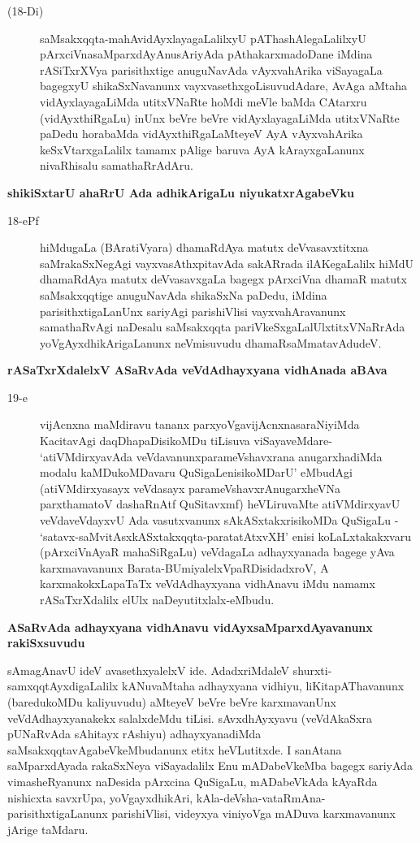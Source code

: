\begin{description}
\item[(18-Di)] saMsakxqqta-mahAvidAyxlayagaLalilxyU pAThashAlegaLalilxyU pArxciVna\break saMparxdAyAnu\-sAri\-yAda pAthakarxmadoDane iMdina rASiTxrXVya pari\-sithxtige anuguNavAda vAyxvahArika viSayagaLa bagegxyU shikaSxNavanunx vayxvasethxgoLisuvudAdare, AvAga aMtaha vidAyxlayagaLiMda utitxVNaRte hoMdi meVle baMda CAtarxru (vidAyxthiRgaLu) inUnx beVre beVre vidAyxlayagaLiMda utitxVNaRte paDedu hora\-baMda vidAyxthiRgaLaMteyeV AyA vAyxvahArika keSxVtarxgaLalilx tamamx pAlige baruva AyA kArayxgaLanunx nivaR\-hisalu samathaRrAdAru.
\end{description}
{\noindent
{\large\bf shikiSxtarU ahaRrU Ada adhikArigaLu niyukatxrAgabeVku}}
\begin{description}
\item[18-ePf] hiMdugaLa (BAratiVyara) dhamaRdAya matutx deVvasavxtitxna saMrakaSxNe\-gAgi vayxvasAthxpitavAda sakAR\-rada ilAKegaLalilx hiMdU dhamaRdAya matutx deVvasavxgaLa bagegx pArxciVna dhamaR matutx saMsakxqq\-tige anuguNavAda shikaSxNa paDedu, iMdina parisithxtigaLanUnx sariyAgi parishiVlisi vayxva\-hAra\-vanunx samathaRvAgi naDesalu saMsakxqqta pariVkeSxgaLalUlxtitxVNaRrAda yoVgAyxdhikArigaLanunx neVmisu\-vudu dhamaRsaMmatavAdudeV.
\end{description}
{\noindent
{\large\bf rASaTxrXdalelxV ASaRvAda veVdAdhayxyana vidhAnada aBAva}}\label{page47}
\begin{description}
\item[19-e] vijAcnxna maMdiravu tananx parxyoVgavijAcnxnasaraNiyiMda KacitavAgi daqDha\-paDisikoMDu tiLisuva viSayaveMdare- `atiVMdirxyavAda veVdavanunx\break parameVshavxrana anugarxhadiMda modalu kaMDu\-koMDavaru QuSigaLenisi\break\-koMDarU' eMbudAgi (atiVMdirxyasayx veVdasayx\label{47} parameVshavxrAnu\-garxheVNa parxthamatoV dashaRnAtf QuSitavxmf) heVLiruvaMte atiVMdirxyavU veVda\-veVdayxvU Ada vasutx\-vanunx sAkASxtakxrisikoMDa QuSigaLu - `satavx-saMvitAsxkASx\-takxqqta-paratatAtxvXH'\label{48} enisi koLaLxtakakxvaru (pArx\-ciV\-nAyaR mahaSiRgaLu) veVdagaLa adhayxyanada bagege yAva karxmavavanunx Barata-BUmi\-yalelxV\-paR\-Disi\-dadxroV, A karxmakokxLapaTaTx veVdAdhayxyana vidhAnavu iMdu namamx rASaTxrXdalilx elUlx naDeyutitxlalx-eMbudu.
\end{description}
{\noindent
{\large\bf ASaRvAda adhayxyana vidhAnavu vidAyxsaMparxdAyavanunx rakiSxsuvudu}}\label{page48}
\medskip

\noindent
sAmagAnavU ideV avasethxyalelxV ide. AdadxriMdaleV shurxti-samxqqtAyxdigaLalilx kANu\-vaMtaha adhayxyana vidhiyu, liKitapAThavanunx (baredukoMDu kaliyuvudu) aMteyeV beVre beVre karxmavanUnx veVdA\-dhayxya\-nakekx salalx\-deMdu tiLisi. sAvxdhAyxyavu (veVdAkaSxra pUNaRvAda sAhitayx rAshiyu) adhayxyanadiMda saMsakxqqta\-vAga\-beVkeMbu\-danunx etitx heVLutitxde. I sanAtana saMparxdAyada rakaSxNeya viSayadalilx Enu mADa\-beVkeMba bagegx sariyAda vimasheRyanunx naDesida pArxcina QuSigaLu, mADabeVkAda kAyaRda nishicxta savxrUpa, yoVgayxdhikAri, kAla-deVsha-vataRmAna- parisithxtigaLanunx parishiVlisi, videyxya vini\-yoVga mA\-Duva karxma\-vanunx jArige taMdaru.

